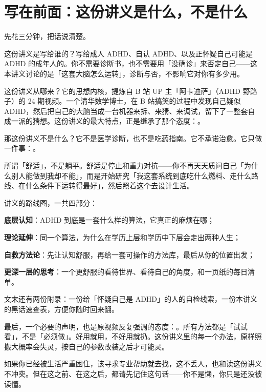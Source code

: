 \section*{写在前面：这份讲义是什么，不是什么}

先花三分钟，把话说清楚。

这份讲义是写给谁的？写给成人 ADHD、自认 ADHD、以及正怀疑自己可能是 ADHD 的成年人的。你不需要诊断书，也不需要用「没确诊」来否定自己——这本讲义讨论的是「这套大脑怎么运转」，诊断与否，不影响它对你有多少用。

这份讲义从哪来？它的思想内核，提炼自 B 站 UP 主「阿卡迪萨」（ADHD 野路子）的 24 期视频。一个清华数学博士，在 B 站搞笑的过程中发现自己疑似 ADHD，然后把自己的大脑当成一台机器来拆、来猜、来调试，留下了一整套自成一派的猜想。这份讲义的最大特点，正是继承了那个态度：。

那这份讲义不是什么？它不是医学诊断，也不是吃药指南。它不承诺治愈。它只做一件事：。


所谓「舒适」，不是躺平。舒适是停止和重力对抗——你不再天天质问自己「为什么别人能做到我却不能」，而是开始研究「我这套系统到底吃什么燃料、走什么路线、在什么条件下运转得最好」，然后照着这个去设计生活。

讲义的路线图，一共四部分：

\begin{checklist}
  \item \textbf{底层认知}：ADHD 到底是一套什么样的算法，它真正的麻烦在哪；
  \item \textbf{理论延伸}：同一个算法，为什么在学历上层和学历中下层会走出两种人生；
  \item \textbf{自救方法论}：先让认知舒服，再给一套可操作的方法库，最后从你的位置出发；
  \item \textbf{更深一层的思考}：一个更舒服的看待世界、看待自己的角度，和一页纸的每日清单。
\end{checklist}

文末还有两份附录：一份给「怀疑自己是 ADHD」的人的自检线索，一份本讲义的黑话速查表，方便你随时回来翻。

最后，一个必要的声明，也是原视频反复强调的态度：。所有方法都是「试试看」，不是「必须做」。好用就用，不好用就扔。这份讲义里的每一个办法，原样照搬大概率会失灵，按自己的参数改装之后才可能灵。

如果你已经被生活严重困住，该寻求专业帮助就去找，这不丢人，也和读这份讲义不冲突。但在这之前、在这之后，都请先记住这句话——你不是懒，你只是还没被读懂。
